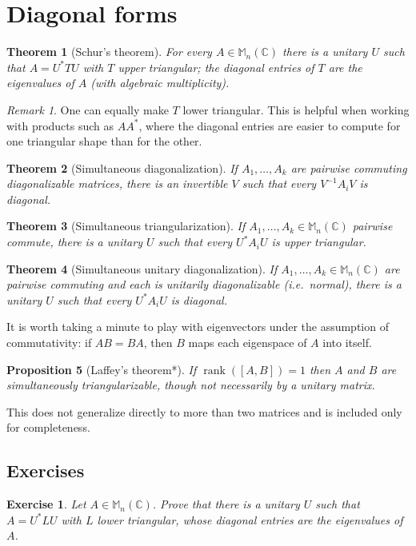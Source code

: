 \documentclass[12pt]{article}
\DeclareMathOperator{\Rank}{rank}
\theoremstyle{breakplain}
\newtheorem{theorem}{Theorem}[section]
\newtheorem{prop}[theorem]{Proposition}
\theoremstyle{breakdef}
\newtheorem{ex}[subsubsection]{Exercise}
\theoremstyle{remark}
\newtheorem*{remark}{Remark}
\begin{document}
\section{Diagonal forms}
\begin{theorem}[Schur's theorem]
    For every $A\in \mathbb{M}_n(\mathbb{C})$ there is a unitary $U$ such that $A=U^*TU$ with $T$ upper triangular; the diagonal entries of $T$ are the eigenvalues of $A$ (with algebraic multiplicity).
\end{theorem}
\begin{remark}
    One can equally make $T$ lower triangular. This is helpful when working with products such as $AA^*$, where the diagonal entries are easier to compute for one triangular shape than for the other.
\end{remark}
\begin{theorem}[Simultaneous diagonalization]
    If $A_1,\ldots,A_k$ are pairwise commuting diagonalizable matrices, there is an invertible $V$ such that every $V^{-1} A_i V$ is diagonal.
\end{theorem}
\begin{theorem}[Simultaneous triangularization]
    If $A_1,\ldots,A_k\in\mathbb{M}_n(\mathbb{C})$ pairwise commute, there is a unitary $U$ such that every $U^{*} A_i U$ is upper triangular.
\end{theorem}
\begin{theorem}[Simultaneous unitary diagonalization]
    If $A_1,\ldots,A_k\in\mathbb{M}_n(\mathbb{C})$ are pairwise commuting and each is unitarily diagonalizable (i.e.\ normal), there is a unitary $U$ such that every $U^{*} A_i U$ is diagonal.
\end{theorem}
It is worth taking a minute to play with eigenvectors under the assumption of commutativity: if $AB=BA$, then $B$ maps each eigenspace of $A$ into itself.
\begin{prop}[Laffey's theorem*]
    If $\Rank([A,B])=1$ then $A$ and $B$ are simultaneously triangularizable, though not necessarily by a unitary matrix.
\end{prop}
This does not generalize directly to more than two matrices and is included only for completeness.

\subsection{Exercises}
\begin{ex}
    Let $A\in \mathbb{M}_n(\mathbb{C})$. Prove that there is a unitary $U$ such that $A=U^*LU$ with $L$ lower triangular, whose diagonal entries are the eigenvalues of $A$.
\end{ex}
\end{document}
